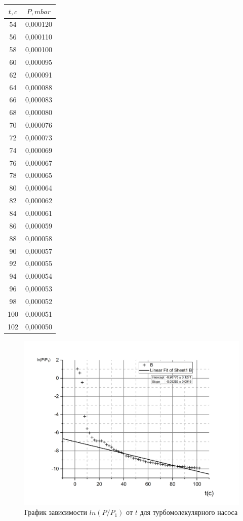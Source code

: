 \documentclass[a4paper, 12pt]{article}%
\begin{document}
\begin{enumerate}
\begin{tabular}{|c|c|}
\end{tabular}
\begin{tabular}{|c|c|}
\hline
$t, c$ & $P, mbar$ \\ \hline
54 & 0,000120 \\ \hline
56 & 0,000110 \\ \hline
58 & 0,000100 \\ \hline
60 & 0,000095 \\ \hline
62 & 0,000091 \\ \hline
64 & 0,000088 \\ \hline
66 & 0,000083 \\ \hline
68 & 0,000080 \\ \hline
70 & 0,000076 \\ \hline
72 & 0,000073 \\ \hline
74 & 0,000069 \\ \hline
76 & 0,000067 \\ \hline
78 & 0,000065 \\ \hline
80 & 0,000064 \\ \hline
82 & 0,000062 \\ \hline
84 & 0,000061 \\ \hline
86 & 0,000059 \\ \hline
88 & 0,000058 \\ \hline
90 & 0,000057 \\ \hline
92 & 0,000055 \\ \hline
94 & 0,000054 \\ \hline
96 & 0,000053 \\ \hline
98 & 0,000052 \\ \hline
100 & 0,000051 \\ \hline
102 & 0,000050 \\ \hline
\end{tabular}
\begin{figure}[h]
\includegraphics[width = \textwidth]{231_5.jpg}
\caption{График зависимости $ln(P/P_1)$ от $t$ для турбомолекулярного насоса}
\end{figure}

\end{enumerate}
\end{document}

